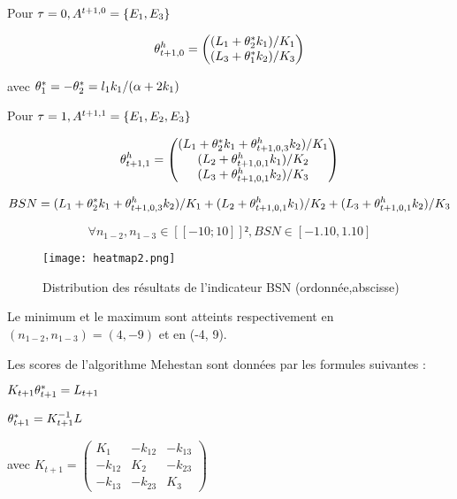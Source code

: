 Pour $\tau=0, A^{t+1,0}=\left\lbrace E_1,E_3 \right\rbrace$

\begin{align*}
  \theta^h_{t+1,0}= \begin{pmatrix}
(L_1+\theta^*_{2} k_1) / K_1 \\
(L_3+\theta^*_{1} k_2) / K_3
\end{pmatrix}  
\end{align*}

avec $\theta^*_{1} = - \theta^*_{2} = l_1 k_1/(\alpha + 2 k_1)$

Pour $\tau=1, A^{t+1,1}=\left\lbrace E_1,E_2,E_3 \right\rbrace$

\begin{align*}
\theta^h_{t+1,1}= \begin{pmatrix}
(L_1+\theta^*_{2} k_1 + \theta^h_{t+1,0,3} k_2) / K_1 \\
(L_2+\theta^h_{t+1,0,1} k_1) / K_2 \\
(L_3+\theta^h_{t+1,0,1} k_2) / K_3 
\end{pmatrix}    
\end{align*} 


\begin{align*}
 BSN =
(L_1+\theta^*_{2} k_1 + \theta^h_{t+1,0,3} k_2) / K_1 +
(L_2+\theta^h_{t+1,0,1} k_1) / K_2 +
(L_3+\theta^h_{t+1,0,1} k_2) / K_3 
\end{align*}

\begin{equation*}
    \forall{n_{1-2},n_{1-3}}\in [\![-10;10]\!]² , BSN \in [-1.10,1.10]
\end{equation*}

\begin{figure}[ht]
  \texttt{[image: heatmap2.png]}
  \caption{Distribution des résultats de l'indicateur BSN (ordonnée,abscisse)}
\end{figure}

Le minimum et le maximum sont atteints respectivement en $(n_{1-2},n_{1-3})=(4, -9)$ et en (-4, 9).


Les scores de l'algorithme Mehestan sont données par les formules suivantes :

$K_{t+1} \theta^*_{t+1}= L_{t+1}$

$\theta^*_{t+1}=K^{-1}_{t+1} L$

avec 
$ K_{t+1}= \begin{pmatrix}
K_1&-k_{12}&-k_{13}\\
-k_{12}&K_2&-k_{23}\\
-k_{13}&-k_{23}&K_3
\end{pmatrix}$


